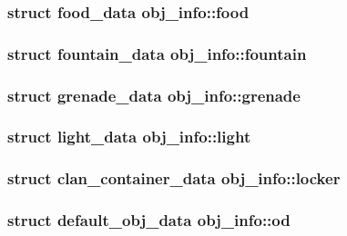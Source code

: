 \hypertarget{unionobj__info_ae4467830a38c1e6d5169f237922db4ab}{
\subsubsection[{food}]{\setlength{\rightskip}{0pt plus 5cm}struct {\bf food\-\_\-data} obj\-\_\-info\-::food}}\label{unionobj__info_ae4467830a38c1e6d5169f237922db4ab}
\hypertarget{unionobj__info_a4b2609633e61c3c77c8ef1bebdd14bd3}{
\subsubsection[{fountain}]{\setlength{\rightskip}{0pt plus 5cm}struct {\bf fountain\-\_\-data} obj\-\_\-info\-::fountain}}\label{unionobj__info_a4b2609633e61c3c77c8ef1bebdd14bd3}
\hypertarget{unionobj__info_a4aa6f3fa4d6f8e47c0e5c2f06d3a1822}{
\subsubsection[{grenade}]{\setlength{\rightskip}{0pt plus 5cm}struct {\bf grenade\-\_\-data} obj\-\_\-info\-::grenade}}\label{unionobj__info_a4aa6f3fa4d6f8e47c0e5c2f06d3a1822}
\hypertarget{unionobj__info_ad91b396eb5177b944eee479853d40160}{
\subsubsection[{light}]{\setlength{\rightskip}{0pt plus 5cm}struct {\bf light\-\_\-data} obj\-\_\-info\-::light}}\label{unionobj__info_ad91b396eb5177b944eee479853d40160}
\hypertarget{unionobj__info_acc86008678fa13348f1fdc418932f42c}{
\subsubsection[{locker}]{\setlength{\rightskip}{0pt plus 5cm}struct {\bf clan\-\_\-container\-\_\-data} obj\-\_\-info\-::locker}}\label{unionobj__info_acc86008678fa13348f1fdc418932f42c}
\hypertarget{unionobj__info_a560bf8ec14547a42958e5e788d691660}{
\subsubsection[{od}]{\setlength{\rightskip}{0pt plus 5cm}struct {\bf default\-\_\-obj\-\_\-data} obj\-\_\-info\-::od}}\label{unionobj__info_a560bf8ec14547a42958e5e788d691660}
